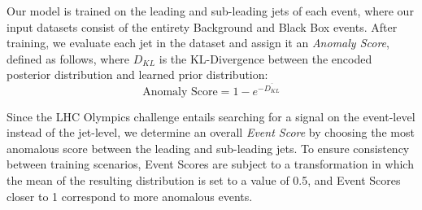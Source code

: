 \documentclass[letterpaper,11pt]{article}
\begin{document}
Our model is trained on the leading and sub-leading jets of each event, where our input datasets consist of the entirety Background and Black Box events. After training, we evaluate each jet in the dataset and assign it an \textit{Anomaly Score}, defined as follows, where $D_{KL}$ is the KL-Divergence between the encoded posterior distribution and learned prior distribution:
\begin{equation}
\text{Anomaly Score} = 1 - e^{-\overline{D_{KL}}}
\end{equation}


Since the LHC Olympics challenge entails searching for a signal on the event-level instead of the jet-level, we determine an overall \textit{Event Score} by choosing the most anomalous score between the leading and sub-leading jets. To ensure consistency between training scenarios, Event Scores are subject to a transformation in which the mean of the resulting distribution is set to a value of 0.5, and Event Scores closer to 1 correspond to more anomalous events. 

\end{document}

